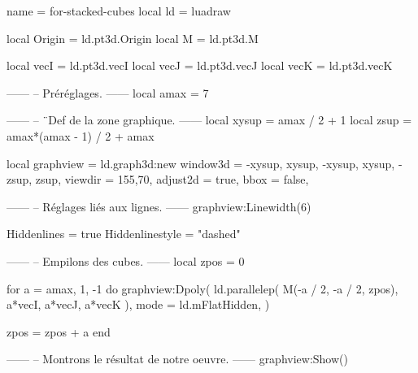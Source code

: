 \documentclass[border = 3pt]{standalone}
\begin{document}
\begin{luadraw*}{name = for-stacked-cubes}
local ld = luadraw

local Origin = ld.pt3d.Origin
local M      = ld.pt3d.M

local vecI = ld.pt3d.vecI
local vecJ = ld.pt3d.vecJ
local vecK = ld.pt3d.vecK

------
-- Préréglages.
------
local amax = 7

------
-- ¨Def de la zone graphique.
------
local xysup = amax / 2 + 1
local zsup  = amax*(amax - 1) / 2 + amax

local graphview = ld.graph3d:new{
  window3d = {-xysup, xysup, -xysup, xysup, -zsup, zsup},
  viewdir  = {155,70},
  adjust2d = true,
  bbox     = false,
}

------
-- Réglages liés aux lignes.
------
graphview:Linewidth(6)

Hiddenlines     = true
Hiddenlinestyle = "dashed"

------
-- Empilons des cubes.
------
local zpos  = 0

for a = amax, 1, -1 do
  graphview:Dpoly(
    ld.parallelep(
      M(-a / 2, -a / 2, zpos),
      a*vecI, a*vecJ, a*vecK
    ),
    {
      mode = ld.mFlatHidden,
    }
  )

  zpos = zpos + a
end

------
-- Montrons le résultat de notre oeuvre.
------
graphview:Show()
\end{luadraw*}
\end{document}
